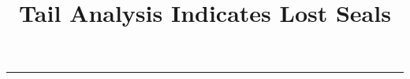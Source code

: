 \documentclass[times]{zHenriquesLab-StyleBioRxiv}
\begin{document}
\title{Tail Analysis Indicates Lost Seals} 
\onecolumn \maketitle
\vspace*{-5mm} 
\noindent\textcolor{sunyGray}{\rule{17.25cm}{1mm}}
% 
% 
% 
\end{document}

